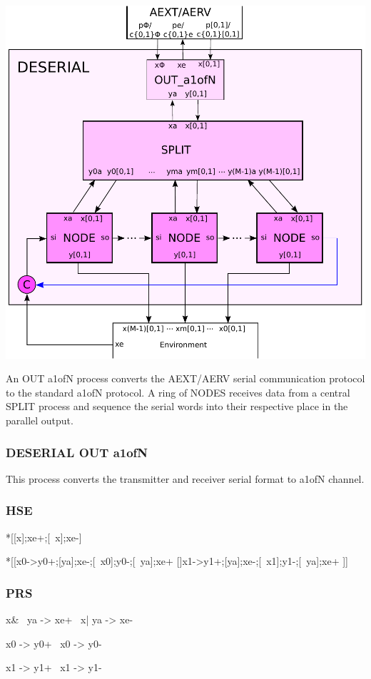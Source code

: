 \documentclass{article}
\begin{document}
\begin{center}
  \includegraphics[width=.45\textwidth]{img/deserial.pdf}
\end{center}

An OUT a1ofN process converts the AEXT/AERV serial communication protocol to the
standard a1ofN protocol. A ring of NODES receives data from a central SPLIT
process and sequence the serial words into their respective place in the parallel 
output. 

\subsubsection{DESERIAL OUT a1ofN \label{sec:OUT_a1ofN}}

This process converts the transmitter and receiver serial format to a1ofN channel.

\subsubsection*{HSE}

\begin{hse}
*[[x\phi];xe+;[~x\phi];xe-]

*[[x0->y0+;[ya];xe-;[~x0];y0-;[~ya];xe+
  []x1->y1+;[ya];xe-;[~x1];y1-;[~ya];xe+
 ]]
\end{hse}

\subsubsection*{PRS}

\begin{prs2}
x\phi & ~ya -> xe+
~x\phi | ya -> xe-
\end{prs2}

\begin{prs2}
x0 -> y0+
~x0 -> y0-

x1 -> y1+
~x1 -> y1-
\end{prs2}
\end{document}

